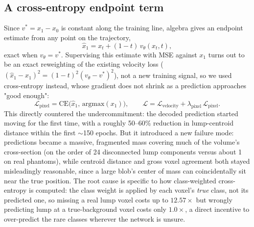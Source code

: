 \documentclass[11pt]{article}
\begin{document}
\subsection{A cross-entropy endpoint term}
Since $v^*=x_1-x_0$ is constant along the training line, algebra gives an endpoint estimate from
any point on the trajectory,
\begin{equation}
\hat x_1 = x_t + (1-t)\,v_\theta(x_t,t), \label{eq:endpoint}
\end{equation}
exact when $v_\theta=v^*$. Supervising this estimate with MSE against $x_1$ turns out to be an
exact reweighting of the existing velocity loss ($(\hat x_1-x_1)^2=(1-t)^2(v_\theta-v^*)^2$),
not a new training signal, so we used cross-entropy instead, whose gradient does not shrink as a
prediction approaches "good enough":
\begin{equation}
\mathcal{L}_{\text{pixel}} = \text{CE}\big(\hat x_1,\,\text{argmax}(x_1)\big), \qquad
\mathcal{L} = \mathcal{L}_{\text{velocity}} + \lambda_{\text{pixel}}\,\mathcal{L}_{\text{pixel}}.
\label{eq:pixel-loss}
\end{equation}
This directly countered the undercommitment: the decoded prediction started moving for the
first time, with a roughly 50--60\% reduction in lump-centroid distance within the first
$\sim$150 epochs. But it introduced a new failure mode: predictions became a massive, fragmented
mass covering much of the volume's cross-section (on the order of 24 disconnected lump
components versus about 1 on real phantoms), while centroid distance and gross voxel agreement
both stayed misleadingly reasonable, since a large blob's center of mass can coincidentally sit
near the true position. The root cause is specific to how class-weighted cross-entropy is
computed: the class weight is applied by each voxel's \emph{true} class, not its predicted one,
so missing a real lump voxel costs up to $12.57\times$ but wrongly predicting lump at a
true-background voxel costs only $1.0\times$, a direct incentive to over-predict the rare
classes wherever the network is unsure.
\end{document}
